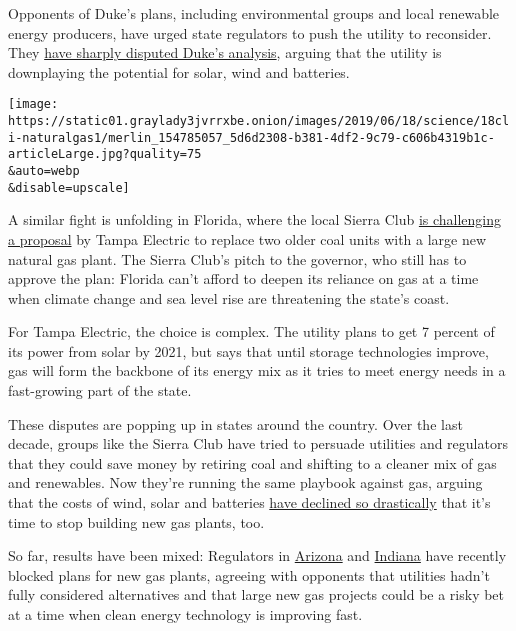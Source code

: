 Opponents of Duke's plans, including environmental groups and local
renewable energy producers, have urged state regulators to push the
utility to reconsider. They
\href{https://drive.google.com/file/d/1BXbaHrhTTSAk7yq7WsMQwlnlkCBG5l35/view}{have
sharply disputed Duke's analysis}, arguing that the utility is
downplaying the potential for solar, wind and batteries.

\texttt{[image: https://static01.graylady3jvrrxbe.onion/images/2019/06/18/science/18cli-naturalgas1/merlin\_154785057\_5d6d2308-b381-4df2-9c79-c606b4319b1c-articleLarge.jpg?quality=75\\\&auto=webp\\\&disable=upscale]}

A similar fight is unfolding in Florida, where the local Sierra Club
\href{https://www.sierraclub.org/press-releases/2019/05/despite-opposition-judge-allows-teco-plans-for-fracked-gas-and-coal-move}{is
challenging a proposal} by Tampa Electric to replace two older coal
units with a large new natural gas plant. The Sierra Club's pitch to the
governor, who still has to approve the plan: Florida can't afford to
deepen its reliance on gas at a time when climate change and sea level
rise are threatening the state's coast.

For Tampa Electric, the choice is complex. The utility plans to get 7
percent of its power from solar by 2021, but says that until storage
technologies improve, gas will form the backbone of its energy mix as it
tries to meet energy needs in a fast-growing part of the state.

These disputes are popping up in states around the country. Over the
last decade, groups like the Sierra Club have tried to persuade
utilities and regulators that they could save money by retiring coal and
shifting to a cleaner mix of gas and renewables. Now they're running the
same playbook against gas, arguing that the costs of wind, solar and
batteries
\href{https://rmi.org/insight/the-economics-of-clean-energy-portfolios/}{have
declined so drastically} that it's time to stop building new gas plants,
too.

So far, results have been mixed: Regulators in
\href{https://www.utilitydive.com/news/arizona-regulators-move-to-place-gas-plant-moratorium-on-utilities/519176/}{Arizona}
and
\href{https://www.utilitydive.com/news/indiana-regulators-reject-vectren-gas-plant-over-stranded-asset-concerns/553456/}{Indiana}
have recently blocked plans for new gas plants, agreeing with opponents
that utilities hadn't fully considered alternatives and that large new
gas projects could be a risky bet at a time when clean energy technology
is improving fast.

